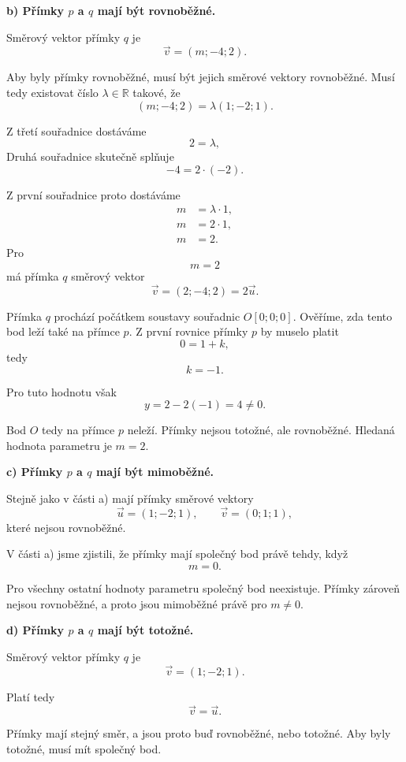\begin{example}
    \textbf{b) Přímky $p$ a $q$ mají být rovnoběžné.}

    Směrový vektor přímky $q$ je
    \[
        \vec{v}=(m;-4;2).
    \]

    Aby byly přímky rovnoběžné, musí být jejich směrové vektory
    rovnoběžné. Musí tedy existovat číslo $\lambda\in\mathbb{R}$ takové,
    že
    \[
        (m;-4;2)=\lambda(1;-2;1).
    \]

    Z třetí souřadnice dostáváme
    \[
        2=\lambda,
    \]
    Druhá souřadnice skutečně splňuje
    \[
        -4=2\cdot(-2).
    \]

    Z první souřadnice proto dostáváme
    \begin{align*}
        m&=\lambda \cdot1,\\
        m&=2\cdot1,\\
        m&=2.
    \end{align*}
    Pro
    \[
        m=2
    \]
    má přímka $q$ směrový vektor
    \[
        \vec{v}=(2;-4;2)=2\vec{u}.
    \]

    Přímka $q$ prochází počátkem soustavy souřadnic $O[0;0;0]$.
    Ověříme, zda tento bod leží také na přímce $p$. Z první rovnice
    přímky $p$ by muselo platit
    \[
        0=1+k,
    \]
    tedy
    \[
        k=-1.
    \]

    Pro tuto hodnotu však
    \[
        y=2-2(-1)=4\neq0.
    \]

    Bod $O$ tedy na přímce $p$ neleží. Přímky nejsou totožné, ale rovnoběžné.
    Hledaná hodnota parametru je $m=2$. 

    \textbf{c) Přímky $p$ a $q$ mají být mimoběžné.}

    Stejně jako v části a) mají přímky směrové vektory
    \[
        \vec{u}=(1;-2;1),
        \qquad
        \vec{v}=(0;1;1),
    \]
    které nejsou rovnoběžné.

    V části a) jsme zjistili, že přímky mají společný bod právě tehdy,
    když
    \[
        m=0.
    \]

    Pro všechny ostatní hodnoty parametru společný bod neexistuje.
    Přímky zároveň nejsou rovnoběžné, a proto jsou mimoběžné právě pro $m\neq0$.


    \textbf{d) Přímky $p$ a $q$ mají být totožné.}

    Směrový vektor přímky $q$ je
    \[
        \vec{v}=(1;-2;1).
    \]

    Platí tedy
    \[
        \vec{v}=\vec{u}.
    \]

    Přímky mají stejný směr, a jsou proto buď rovnoběžné, nebo
    totožné. Aby byly totožné, musí mít společný bod.


\end{example}

